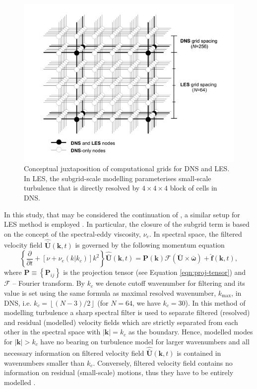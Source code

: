 \documentclass{pracamgren}
\begin{document}
\begin{figure}[h]
\centering
\includegraphics[width=17cm]{figures/1-02_dns-les-grids.pdf}
\caption{
Conceptual juxtaposition of computational grids for DNS and LES.
In LES, the subgrid-scale modelling parameterises small-scale turbulence that is directly resolved by $4 \times 4 \times 4$ block of cells in DNS.
}
\label{fig:dns-les-grids}
\end{figure}

In this study, that may be considered the continuation of \textcite{Rosa2017}, a similar setup for LES method is employed \parencite[based on earlier work by][]{Jin2010}.
In particular, the closure of the subgrid term is based on the concept of the spectral-eddy viscosity, $\nu_{e}$.
In spectral space, the filtered velocity field $\mathbf{\hat{\bar{U}}}(\mathbf{k}, t)$ is governed by the following momentum equation \parencite{Pope2000}
\begin{equation}
\left\lbrace \frac{\partial}{\partial t} + [\nu + \nu_{e}(k|k_{c})]k^{2} \right\rbrace \mathbf{\hat{\bar{U}}}(\mathbf{k}, t) = \mathbf{P}(\mathbf{k}) \mathcal{F}(\mathbf{\bar{U}} \times \boldsymbol{\bar{\omega}}) + \hat{\mathbf{f}}(\mathbf{k}, t) ,
\label{eqn:les}
\end{equation}
where $\mathbf{P} \equiv \left\{ \mathbf{P}_{ij} \right\}$ is the projection tensor (see Equation \ref{eqn:proj-tensor}) and $\mathcal{F}$ -- Fourier transform.
By $k_{c}$ we denote cutoff wavenumber for filtering and its value is set using the same formula as maximal resolved wavenumber, $k_{\max}$, in DNS, i.e. $k_c = \left\lfloor (N - 3) / 2 \right\rfloor$ (for $N=64$, we have $k_c = 30$).
In this method of modelling turbulence a sharp spectral filter is used to separate filtered (resolved) and residual (modelled) velocity fields which are strictly separated from each other in the spectral space with $| \mathbf{k} | = k_c$ as the boundary.
Hence, modelled modes for $| \mathbf{k} | > k_c$ have no bearing on turbulence model for larger wavenumbers and all necessary information on filtered velocity field $\mathbf{\hat{\bar{U}}}(\mathbf{k}, t)$ is contained in wavenumbers smaller than $k_c$.
Conversely, filtered velocity field contains no information on residual (small-scale) motions, thus they have to be entirely modelled \parencite[p. 615]{Pope2000}.
\end{document}
